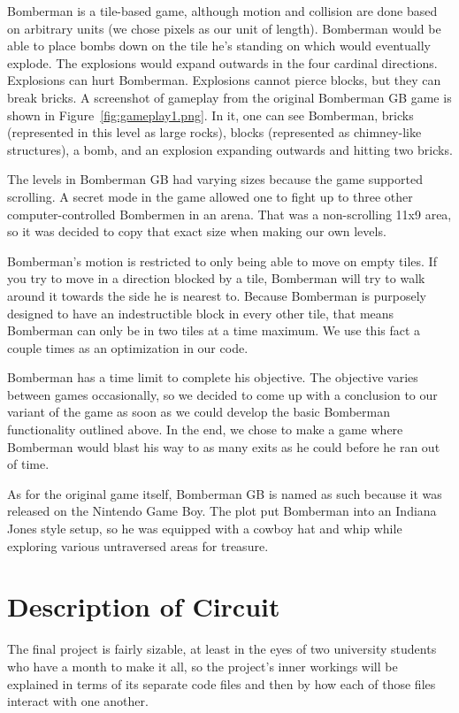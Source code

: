 \documentclass[10pt,a4paper]{article}
\begin{document}
Bomberman is a tile-based game, although motion and collision are done based on arbitrary units (we chose pixels as our unit of length). Bomberman would be able to place bombs down on the tile he's standing on which would eventually explode. The explosions would expand outwards in the four cardinal directions. Explosions can hurt Bomberman. Explosions cannot pierce blocks, but they can break bricks. A screenshot of gameplay from the original Bomberman GB game is shown in Figure~\ref{fig:gameplay1.png}. In it, one can see Bomberman, bricks (represented in this level as large rocks), blocks (represented as chimney-like structures), a bomb, and an explosion expanding outwards and hitting two bricks.

The levels in Bomberman GB had varying sizes because the game supported scrolling. A secret mode in the game allowed one to fight up to three other computer-controlled Bombermen in an arena. That was a non-scrolling 11x9 area, so it was decided to copy that exact size when making our own levels.

Bomberman's motion is restricted to only being able to move on empty tiles. If you try to move in a direction blocked by a tile, Bomberman will try to walk around it towards the side he is nearest to. Because Bomberman is purposely designed to have an indestructible block in every other tile, that means Bomberman can only be in two tiles at a time maximum. We use this fact a couple times as an optimization in our code.

Bomberman has a time limit to complete his objective. The objective varies between games occasionally, so we decided to come up with a conclusion to our variant of the game as soon as we could develop the basic Bomberman functionality outlined above. In the end, we chose to make a game where Bomberman would blast his way to as many exits as he could before he ran out of time.

As for the original game itself, Bomberman GB is named as such because it was released on the Nintendo Game Boy. The plot put Bomberman into an Indiana Jones style setup, so he was equipped with a cowboy hat and whip while exploring various untraversed areas for treasure.

\section{Description of Circuit}
The final project is fairly sizable, at least in the eyes of two university students who have a month to make it all, so the project's inner workings will be explained in terms of its separate code files and then by how each of those files interact with one another.
\end{document}
